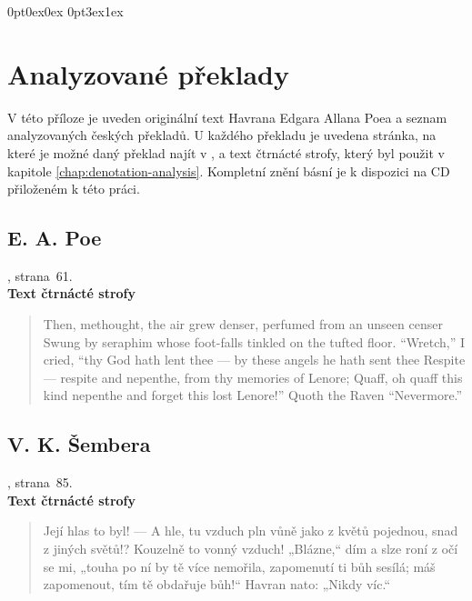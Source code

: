 \documentclass[dp.tex]{subfiles}
\begin{document}
\titleformat{\chapter}[display]
  {\normalfont\huge\bfseries}{\chaptertitlename\ \thechapter}{20pt}{\Huge}
\titlespacing*{\chapter}
{0pt}{0ex}{0ex}
\titlespacing*{\section}
{0pt}{3ex}{1ex}


\chapter{Analyzované překlady}
\label{appendix:preklady}

V této příloze je uveden originální text Havrana Edgara Allana Poea a seznam analyzovaných českých překladů. U každého překladu je uvedena stránka, na které je možné daný překlad najít v \cite{Poe1990}, a text čtrnácté strofy, který byl použit v kapitole \ref{chap:denotation-analysis}. Kompletní znění básní je k dispozici na CD přiloženém k této práci.

\section*{E. A. Poe}

, strana~61.
\\\textbf{Text čtrnácté strofy}
\begin{verse}
Then, methought, the air grew denser, perfumed from an unseen censer 
Swung by seraphim whose foot-falls tinkled on the tufted floor. 
“Wretch,” I cried, “thy God hath lent thee — by these angels he hath sent thee 
Respite — respite and nepenthe, from thy memories of Lenore; 
Quaff, oh quaff this kind nepenthe and forget this lost Lenore!” 
Quoth the Raven “Nevermore.” 
\end{verse}

\section*{V. K. Šembera}
, strana~85.
\\\textbf{Text čtrnácté strofy}
\begin{verse}
Její hlas to byl! — A hle, tu vzduch pln vůně jako z květů
 pojednou, snad z jiných světů!? Kouzelně to vonný vzduch!
 „Blázne,“ dím a slze roní z očí se mi, „touha po ní
 by tě více nemořila, zapomenutí ti bůh
 sesílá; máš zapomenout, tím tě obdařuje bůh!“
        Havran nato: „Nikdy víc.“
\end{verse}
\end{document}
